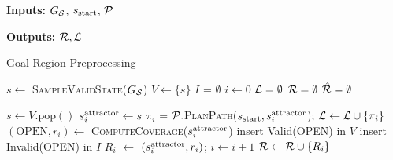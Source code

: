 \documentclass[a4paper]{report}
\begin{document}
\begin{algorithm}[t]
\hspace*{\algorithmicindent} \textbf{Inputs:} $G_\mathcal{S}$, $s_{\textrm{start}}$, $\mathcal{P}$

\hspace*{\algorithmicindent} \textbf{Outputs:} 
$\mathcal{R}, \mathcal{L}$

\caption{Goal Region Preprocessing}\label{alg:1}
\begin{algorithmic}[1]
  \State $s \leftarrow$\textsc{ SampleValidState}($G_\mathcal{S}$)
  \State $V \leftarrow \{ s \}$    \label{alg:1:v}
  \State $I$ = $\emptyset$    \label{alg:1:i}
  \State $ i \leftarrow 0$
       \hspace{2mm} 
       $\mathcal{L} = \emptyset$
       \hspace{2mm} 
       $\mathcal{R} = \emptyset$
       \hspace{2mm} 
       $\hat{\mathcal{R}} = \emptyset$
       
  \vspace{2mm}
          \State $s \leftarrow V.\text{pop}()$ \label{alg:1:pop}
              \label{alg:1:discard}
        \State $s^{\text{attractor}}_i \leftarrow s$               
        \label{alg:1:attract} 
                \State $\pi_i$ = $\mathcal{P}.$\textsc{PlanPath}($s_{\textrm{start}}, s^{\text{attractor}}_i$); \label{alg:1:pp}
                \hspace{2mm }
                $\mathcal{L} \leftarrow \mathcal{L} \cup \{ \pi_i \}$  \label{alg:1:path}
                \State $(\text{OPEN}, r_i) \leftarrow$ \textsc{ComputeCoverage}($s^{\text{attractor}}_i$) \label{alg:1:cr}
                \State insert Valid(OPEN) in $V$  \label{alg:1:insert_v}
                \State insert Invalid(OPEN) in $I$   \label{alg:1:insert_i}
                \State $R_i$ $\leftarrow$ $(s^{\text{attractor}}_i, r_i)$; 
                \hspace{2mm} $ i \leftarrow i+1$        \hspace{2mm }
                $\mathcal{R} \leftarrow \mathcal{R} \cup \{ R_i \}$
                            \EndIf
        \EndWhile


\end{algorithmic}
\end{algorithm}
\end{document}
